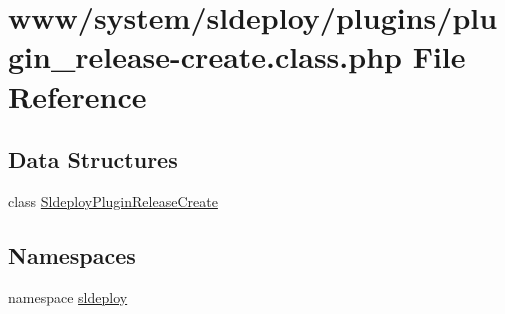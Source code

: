 \hypertarget{plugin__release-create_8class_8php}{
\section{www/system/sldeploy/plugins/plugin\_\-release-\/create.class.php File Reference}
\label{plugin__release-create_8class_8php}
}
\subsection*{Data Structures}
\begin{DoxyCompactItemize}
\item 
class \hyperlink{class_sldeploy_plugin_release_create}{SldeployPluginReleaseCreate}
\end{DoxyCompactItemize}
\subsection*{Namespaces}
\begin{DoxyCompactItemize}
\item 
namespace \hyperlink{namespacesldeploy}{sldeploy}
\end{DoxyCompactItemize}
